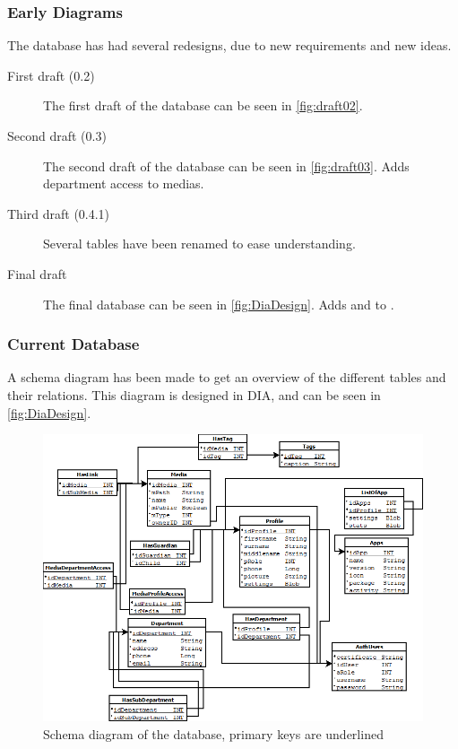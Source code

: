 \subsubsection*{Early Diagrams}
The database has had several redesigns, due to new requirements and new ideas.
\begin{description}
	\item[First draft (0.2)] The first draft of the database can be seen in \autoref{fig:draft02}.
	\item[Second draft (0.3)] The second draft of the database can be seen in \autoref{fig:draft03}. Adds department access to medias.
	\item[Third draft (0.4.1)] Several tables have been renamed to ease understanding.
	\item[Final draft] The final database can be seen in \autoref{fig:DiaDesign}. Adds  and  to .
\end{description}

\subsubsection*{Current Database}
A schema diagram has been made to get an overview of the different tables and their relations. This diagram is designed in DIA\cite{Dia}, and can be seen in \autoref{fig:DiaDesign}.

\begin{figure}[htbp]
	\centering
		\includegraphics[width=1.00\textwidth]{images/DiaDesign.png}
	\caption{Schema diagram of the database, primary keys are underlined}
	\label{fig:DiaDesign}
\end{figure}

